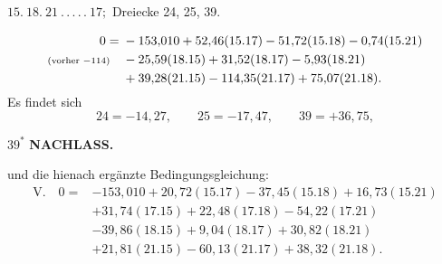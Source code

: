 \par\bigskip
\begin{center}
$15.\ 18.\ 21\ .\,.\,.\,.\,.\ 17;$ Dreiecke 24, 25, 39.
\end{center}
\[
\begin{aligned}
0={}&-153{,}010+52{,}46(15.17)-51{,}72(15.18)-0{,}74(15.21)\\
\text{\scriptsize(vorher $-114$)}\quad&-25{,}59(18.15)+31{,}52(18.17)-5{,}93(18.21)\\
&+39{,}28(21.15)-114{,}35(21.17)+75{,}07(21.18).
\end{aligned}
\]
Es findet sich
\[
24=-14{,}27,\qquad25=-17{,}47,\qquad39=+36{,}75,
\]
\par\smallskip\noindent\hfill$39^\ast$
\newpage
{}\hfill\textbf{NACHLASS.}\par\medskip
\noindent und die hienach ergänzte Bedingungsgleichung:
\[
\begin{aligned}
\mathrm{V.}\quad0={}&-153{,}010+20{,}72(15.17)-37{,}45(15.18)+16{,}73(15.21)\\
&+31{,}74(17.15)+22{,}48(17.18)-54{,}22(17.21)\\
&-39{,}86(18.15)+9{,}04(18.17)+30{,}82(18.21)\\
&+21{,}81(21.15)-60{,}13(21.17)+38{,}32(21.18).
\end{aligned}
\]

